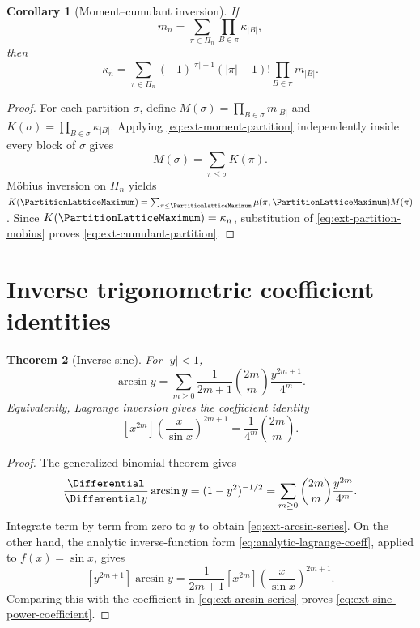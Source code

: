 \documentclass[11pt,a4paper,oneside,openany]{book}
\newtheorem{theorem}{Theorem}[chapter]
\newtheorem{corollary}[theorem]{Corollary}
\theoremstyle{definition}
\theoremstyle{remark}
\begin{document}
\begin{corollary}[Moment--cumulant inversion]
If
\begin{equation}\label{eq:ext-moment-partition}
 m_n=\sum_{\pi\in\Pi_n}\prod_{B\in\pi}\kappa_{|B|},
\end{equation}
then
\begin{equation}\label{eq:ext-cumulant-partition}
 \kappa_n=\sum_{\pi\in\Pi_n}
 (-1)^{|\pi|-1}(|\pi|-1)!\prod_{B\in\pi}m_{|B|}.
\end{equation}
\end{corollary}
\begin{proof}
For each partition \(\sigma\), define
\(M(\sigma)=\prod_{B\in\sigma}m_{|B|}\) and
\(K(\sigma)=\prod_{B\in\sigma}\kappa_{|B|}\).  Applying
\eqref{eq:ext-moment-partition} independently inside every block of \(\sigma\)
gives
\[
 M(\sigma)=\sum_{\pi\le\sigma}K(\pi).
\]
M\"obius inversion on \(\Pi_n\) yields
\(K(\PartitionLatticeMaximum)=\sum_{\pi\le\PartitionLatticeMaximum}
 \mu(\pi,\PartitionLatticeMaximum)M(\pi)\).  Since
\(K(\PartitionLatticeMaximum)=\kappa_n\), substitution of
\eqref{eq:ext-partition-mobius} proves
\eqref{eq:ext-cumulant-partition}.
\end{proof}

\section{Inverse trigonometric coefficient identities}

\begin{theorem}[Inverse sine]
For \(|y|<1\),
\begin{equation}\label{eq:ext-arcsin-series}
 \arcsin y=\sum_{m\ge0}\frac1{2m+1}\binom{2m}{m}
 \frac{y^{2m+1}}{4^m}.
\end{equation}
Equivalently, Lagrange inversion gives the coefficient identity
\begin{equation}\label{eq:ext-sine-power-coefficient}
 [x^{2m}]\left(\frac{x}{\sin x}\right)^{2m+1}
 =\frac1{4^m}\binom{2m}{m}.
\end{equation}
\end{theorem}
\begin{proof}
The generalized binomial theorem gives
\[
 \frac{\Differential}{\Differential y}\arcsin y=(1-y^2)^{-1/2}
 =\sum_{m\ge0}\binom{2m}{m}\frac{y^{2m}}{4^m}.
\]
Integrate term by term from zero to \(y\) to obtain
\eqref{eq:ext-arcsin-series}.  On the other hand, the analytic inverse-function
form \eqref{eq:analytic-lagrange-coeff}, applied to \(f(x)=\sin x\), gives
\[
 [y^{2m+1}]\arcsin y
 =\frac1{2m+1}[x^{2m}]
 \left(\frac{x}{\sin x}\right)^{2m+1}.
\]
Comparing this with the coefficient in \eqref{eq:ext-arcsin-series} proves
\eqref{eq:ext-sine-power-coefficient}.
\end{proof}
\end{document}
